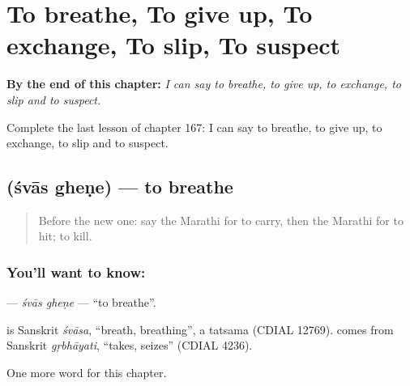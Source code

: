
\chapter{To breathe, To give up, To exchange, To slip, To suspect}
\label{ch:mr-to-breathe-to-give-up-to-exchange-to-slip-to-suspect}

\begin{chapteropening}
\textbf{By the end of this chapter:} \emph{I can say to breathe, to give up, to exchange, to slip and to suspect.}

Complete the last lesson of chapter 167: I can say to breathe, to give up, to exchange, to slip and to suspect.
\end{chapteropening}

\section[\texorpdfstring{\mr{श्वास} \mr{घेणे} (śvās gheṇe)}{श्वास घेणे (śvās gheṇe)}]{  (śvās gheṇe) — to breathe}

\label{lesson:MR-C167-svas-ghene}



\begin{quote}
Before the new one: say the Marathi for to carry, then the Marathi for to hit; to kill.
\end{quote}

\subsection*{You'll want to know:  }
\textbf{ } — \emph{śvās gheṇe} — \textquotedblleft{}to breathe\textquotedblright{}.

\begin{cousinweb}
\textbf{} is Sanskrit \emph{śvāsa}, \textquotedblleft{}breath, breathing\textquotedblright{}, a tatsama (CDIAL 12769). \textbf{} comes from Sanskrit \emph{gṛbhāyati}, \textquotedblleft{}takes, seizes\textquotedblright{} (CDIAL 4236).
\end{cousinweb}

\begin{grammarlens}[title={What you've built}]
One more word for this chapter.
\end{grammarlens}

